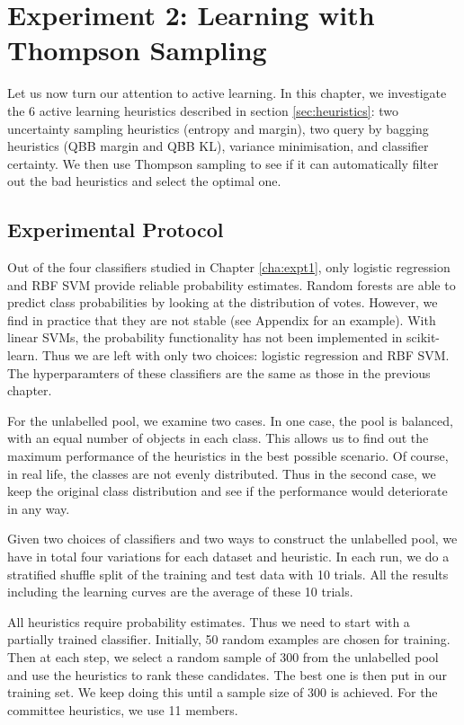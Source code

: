 

\chapter{Experiment 2: Learning with Thompson Sampling}
\label{cha:expt2}

Let us now turn our attention to active learning. In this chapter,
we investigate the 6 active learning heuristics described in section \ref{sec:heuristics}:
two uncertainty sampling heuristics (entropy and margin), two query
by bagging heuristics (QBB margin and QBB KL), variance minimisation,
and classifier certainty. We then use Thompson sampling to see if
it can automatically filter out the bad heuristics and select the optimal one.


\section{Experimental Protocol}
\label{sec:protocol2}

Out of the four classifiers studied in Chapter \ref{cha:expt1}, only logistic regression
and RBF SVM provide reliable probability estimates. Random forests are able to predict
class probabilities by looking at the distribution of votes. However, we find in practice
that they are not stable (see Appendix for an example). With linear SVMs, the probability 
functionality has not been implemented in scikit-learn. Thus we are left
with only two choices: logistic regression and RBF SVM. The hyperparamters of these classifiers
are the same as those in the previous chapter. 

For the unlabelled pool, we examine two cases. In one case, the pool is balanced, with
an equal number of objects in each class. This allows us to find out the maximum
performance of the heuristics in the best possible scenario. Of course, in real life,
the classes are not evenly distributed. Thus in the second case, we keep the original
class distribution and see if the performance would deteriorate in any way.

Given two choices of classifiers and two ways to construct the
unlabelled pool, we have in total four variations for each dataset and heuristic.
In each run, we do a stratified shuffle split of the training and test data with 10 trials.
All the results including the learning curves are the average of these 10 trials.

All heuristics require probability estimates. Thus we need to start with a partially trained
classifier. Initially, 50 random examples are chosen for training. Then at each step,
we select a random sample of 300 from the unlabelled pool and use the heuristics to rank these candidates. The best
one is then put in our training
set. We keep doing this until a sample size of 300 is achieved. For the committee heuristics,
we use 11 members.

